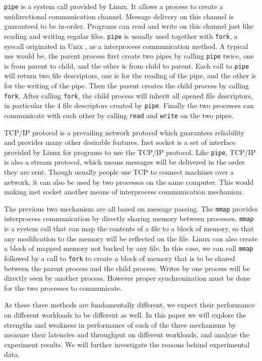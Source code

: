 \documentclass[11pt,conference]{IEEEtran}
\begin{document}
\texttt{pipe} is a system call provided by Linux.
It allows a process to create a unidirectional communication channel.
Message delivery on this channel is guaranteed to be in-order.
Programs can read and write on this channel just like reading and writing regular files.
\texttt{pipe} is usually used together with \texttt{fork}, a syscall originated in Unix \cite{ritchie1978unix}, as a interprocess communication method.
A typical use would be, the parent process first create two pipes by calling \texttt{pipe} twice, one is from parent to child, and the other is from child to parent.
Each call to \texttt{pipe} will return two file descriptors, one is for the reading of the pipe, and the other is for the writing of the pipe.
Then the parent creates the child process by calling \texttt{fork}.
After calling \texttt{fork}, the child process will inherit all opened file descriptors, in particular the $4$ file descriptors created by \texttt{pipe}.
Finally the two processes can communicate with each other by calling \texttt{read} and \texttt{write} on the two pipes.

TCP/IP protocol is a prevailing network protocol which guarantees reliability and provides many other desirable features.
Inet socket is a set of interface provided by Linux for programs to use the TCP/IP protocol.
Like \texttt{pipe}, TCP/IP is also a stream protocol, which means messages will be delivered in the order they are sent.
Though usually people use TCP to connect machines over a network, it can also be used by two processes on the same computer.
This would making inet socket another means of interprocess communication mechanism.

The previous two mechanism are all based on message passing.
The \texttt{mmap} provides interprocess communication by directly sharing memory between processes.
\texttt{mmap} is a system call that can map the contents of a file to a block of memory, so that any modification to the memory will be reflected on the file.
Linux can also create a block of mapped memory not backed by any file.
In this case, we can call \texttt{mmap} followed by a call to \texttt{fork} to create a block of memory that is to be shared between the parent process and the child process.
Writes by one process will be directly seen by another process.
However proper synchronization must be done for the two processes to communicate.

As these three methods are fundamentally different, we expect their performance on different workloads to be different as well.
In this paper we will explore the strengths and weakness in performance of each of the three mechanisms by measure their latencies and throughput on different workloads, and analyze the experiment results.
We will further investigate the reasons behind experimental data.
\end{document}
